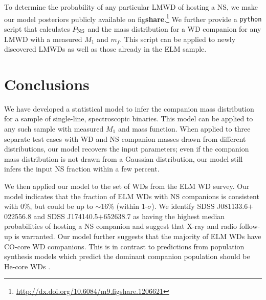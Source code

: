 \documentclass[apjl]{emulateapj}
\newcommand{\mf}{m_f}
\begin{document}



To determine the probability of any particular LMWD of hosting a NS, we make our model posteriors publicly available on fig{\bf share}.\footnote{\url{http://dx.doi.org/10.6084/m9.figshare.1206621}} We further provide a {\tt python} script that calculates $P_{\rm NS}$ and the mass distribution for a WD companion for any LMWD with a measured $M_1$ and $\mf$. This script can be applied to newly discovered LMWDs as well as those already in the ELM sample.



\section{Conclusions}

We have developed a statistical model to infer the companion mass distribution for a sample of single-line, spectroscopic binaries. This model can be applied to any such sample with measured $M_1$ and mass function. When applied to three separate test cases with WD and NS companion masses drawn from different distributions, our model recovers the input parameters; even if the companion mass distribution is not drawn from a Gaussian distribution, our model still infers the input NS fraction within a few percent.


We then applied our model to the set of WDs from the ELM WD survey. Our model indicates that the fraction of ELM WDs with NS companions is consistent with 0\%, but could be up to $\sim$16\% (within 1-$\sigma$). We identify SDSS J081133.6$+$022556.8 and SDSS J174140.5$+$652638.7 as having the highest median probabilities of hosting a NS companion and suggest that X-ray and radio follow-up is warranted. Our model further suggests that the majority of ELM WDs have CO-core WD companions. This is in contrast to predictions from population synthesis models which predict the dominant companion population should be He-core WDs \citep{toonen12}. 

\end{document}
